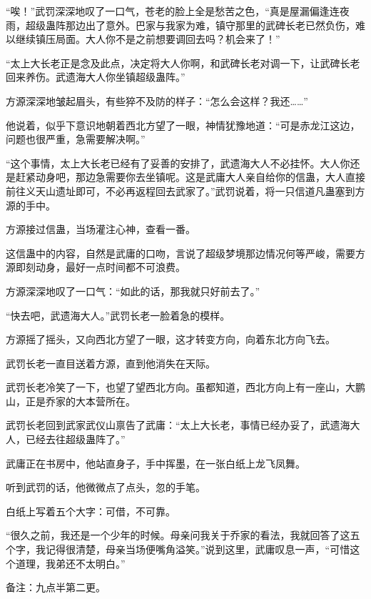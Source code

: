 \begin{this_body}
“唉！”武罚深深地叹了一口气，苍老的脸上全是愁苦之色，“真是屋漏偏逢连夜雨，超级蛊阵那边出了意外。巴家与我家为难，镇守那里的武碑长老已然负伤，难以继续镇压局面。大人你不是之前想要调回去吗？机会来了！”

“太上大长老正是念及此点，决定将大人你啊，和武碑长老对调一下，让武碑长老回来养伤。武遗海大人你坐镇超级蛊阵。”

方源深深地皱起眉头，有些猝不及防的样子：“怎么会这样？我还……”

他说着，似乎下意识地朝着西北方望了一眼，神情犹豫地道：“可是赤龙江这边，问题也很严重，急需要解决啊。”

“这个事情，太上大长老已经有了妥善的安排了，武遗海大人不必挂怀。大人你还是赶紧动身吧，那边急需要你去坐镇呢。这是武庸大人亲自给你的信蛊，大人直接前往义天山遗址即可，不必再返程回去武家了。”武罚说着，将一只信道凡蛊塞到方源的手中。

方源接过信蛊，当场灌注心神，查看一番。

这信蛊中的内容，自然是武庸的口吻，言说了超级梦境那边情况何等严峻，需要方源即刻动身，最好一点时间都不可浪费。

方源深深地叹了一口气：“如此的话，那我就只好前去了。”

“快去吧，武遗海大人。”武罚长老一脸着急的模样。

方源摇了摇头，又向西北方望了一眼，这才转变方向，向着东北方向飞去。

武罚长老一直目送着方源，直到他消失在天际。

武罚长老冷笑了一下，也望了望西北方向。虽都知道，西北方向上有一座山，大鹏山，正是乔家的大本营所在。

武罚长老回到武家武仪山禀告了武庸：“太上大长老，事情已经办妥了，武遗海大人，已经去往超级蛊阵了。”

武庸正在书房中，他站直身子，手中挥墨，在一张白纸上龙飞凤舞。

听到武罚的话，他微微点了点头，忽的手笔。

白纸上写着五个大字：可借，不可靠。

“很久之前，我还是一个少年的时候。母亲问我关于乔家的看法，我就回答了这五个字，我记得很清楚，母亲当场便嘴角溢笑。”说到这里，武庸叹息一声，“可惜这个道理，我弟还不太明白。”

备注：九点半第二更。

\end{this_body}

